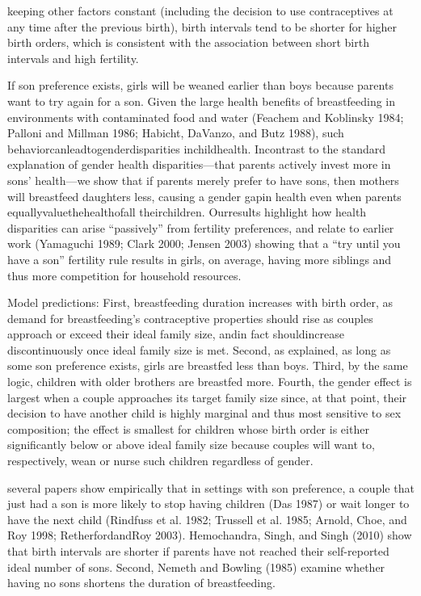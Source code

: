 keeping other factors constant (including the decision to use
contraceptives at any time after the previous birth), birth intervals
tend to be shorter for higher birth orders, which is consistent with the
association between short birth intervals and high fertility.

\citep{Jayachandran2011}

If son preference exists, girls will be weaned earlier than boys because
parents want to try again for a son. Given the large health benefits of
breastfeeding in environments with contaminated food and water (Feachem
and Koblinsky 1984; Palloni and Millman 1986; Habicht, DaVanzo, and Butz
1988), such behaviorcanleadtogenderdisparities inchildhealth. Incontrast
to the standard explanation of gender health disparities—that parents
actively invest more in sons’ health—we show that if parents merely
prefer to have sons, then mothers will breastfeed daughters less,
causing a gender gapin health even when parents
equallyvaluethehealthofall theirchildren. Ourresults highlight how
health disparities can arise “passively” from fertility preferences, and
relate to earlier work (Yamaguchi 1989; Clark 2000; Jensen 2003) showing
that a “try until you have a son” fertility rule results in girls, on
average, having more siblings and thus more competition for household
resources.

Model predictions:
First, breastfeeding duration increases with birth order, as demand for
breastfeeding’s contraceptive properties should rise as couples approach
or exceed their ideal family size, andin fact shouldincrease
discontinuously once ideal family size is met.
Second, as explained, as long as some son preference exists, girls are
breastfed less than boys.
Third, by the same logic, children with older brothers are breastfed more.
Fourth, the gender effect is largest when a couple approaches its target
family size since, at that point, their decision to have another child
is highly marginal and thus most sensitive to sex composition; the
effect is smallest for children whose birth order is either
significantly below or above ideal family size because couples will want
to, respectively, wean or nurse such children regardless of gender.

several papers show empirically that in settings with son preference, a
couple that just had a son is more likely to stop having children (Das
1987) or wait longer to have the next child (Rindfuss et al. 1982;
Trussell et al. 1985; Arnold, Choe, and Roy 1998; RetherfordandRoy
2003). Hemochandra, Singh, and Singh (2010) show that birth intervals
are shorter if parents have not reached their self-reported ideal number
of sons. Second, Nemeth and Bowling (1985) examine whether having no sons
shortens the duration of breastfeeding.


